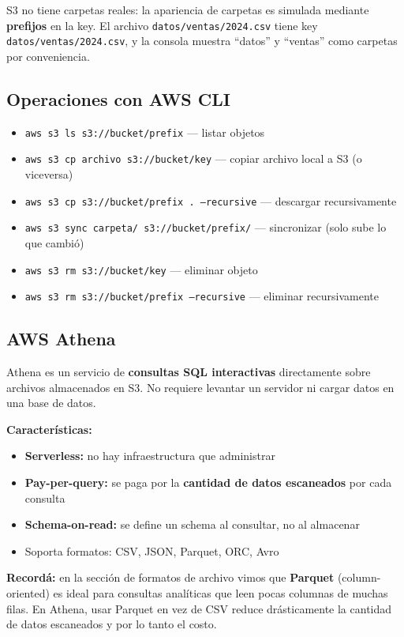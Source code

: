 \documentclass[11pt, a4paper]{article}
\begin{document}
S3 no tiene carpetas reales: la apariencia de carpetas es simulada mediante \textbf{prefijos} en la key. El archivo \texttt{datos/ventas/2024.csv} tiene key \texttt{datos/ventas/2024.csv}, y la consola muestra ``datos'' y ``ventas'' como carpetas por conveniencia.

\subsection{Operaciones con AWS CLI}

\begin{itemize}
	\item \texttt{aws s3 ls s3://bucket/prefix} --- listar objetos
	\item \texttt{aws s3 cp archivo s3://bucket/key} --- copiar archivo local a S3 (o viceversa)
	\item \texttt{aws s3 cp s3://bucket/prefix . --recursive} --- descargar recursivamente
	\item \texttt{aws s3 sync carpeta/ s3://bucket/prefix/} --- sincronizar (solo sube lo que cambió)
	\item \texttt{aws s3 rm s3://bucket/key} --- eliminar objeto
	\item \texttt{aws s3 rm s3://bucket/prefix --recursive} --- eliminar recursivamente
\end{itemize}

\subsection{AWS Athena}

Athena es un servicio de \textbf{consultas SQL interactivas} directamente sobre archivos almacenados en S3. No requiere levantar un servidor ni cargar datos en una base de datos.

\textbf{Características:}
\begin{itemize}
	\item \textbf{Serverless:} no hay infraestructura que administrar
	\item \textbf{Pay-per-query:} se paga por la \textbf{cantidad de datos escaneados} por cada consulta
	\item \textbf{Schema-on-read:} se define un schema al consultar, no al almacenar
	\item Soporta formatos: CSV, JSON, Parquet, ORC, Avro
\end{itemize}

\begin{recallbox}
	\textbf{Recordá:} en la sección de formatos de archivo vimos que \textbf{Parquet} (column-oriented) es ideal para consultas analíticas que leen pocas columnas de muchas filas. En Athena, usar Parquet en vez de CSV reduce drásticamente la cantidad de datos escaneados y por lo tanto el costo.
\end{recallbox}
\end{document}
